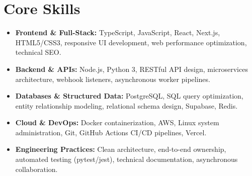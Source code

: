 \documentclass[a4paper,10pt]{article}
\begin{document}
\section{Core Skills}
\begin{itemize}
  \item \textbf{Frontend \& Full-Stack:} TypeScript, JavaScript, React, Next.js, HTML5/CSS3, responsive UI development, web performance optimization, technical SEO.
  \item \textbf{Backend \& APIs:} Node.js, Python 3, RESTful API design, microservices architecture, webhook listeners, asynchronous worker pipelines.
  \item \textbf{Databases \& Structured Data:} PostgreSQL, SQL query optimization, entity relationship modeling, relational schema design, Supabase, Redis.
  \item \textbf{Cloud \& DevOps:} Docker containerization, AWS, Linux system administration, Git, GitHub Actions CI/CD pipelines, Vercel.
  \item \textbf{Engineering Practices:} Clean architecture, end-to-end ownership, automated testing (pytest/jest), technical documentation, asynchronous collaboration.
\end{itemize}
\end{document}
